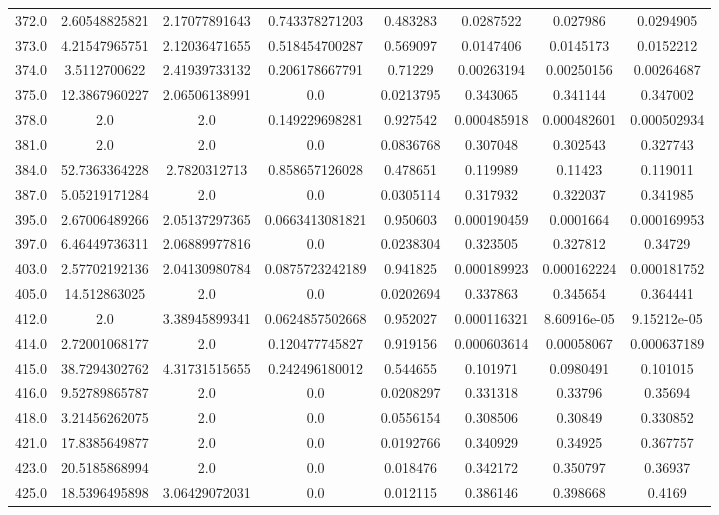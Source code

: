 \begin{longtable}{|c|c|c|c|c|c|c|c|}
372.0 & 2.60548825821 & 2.17077891643 & 0.743378271203 & 0.483283 & 0.0287522 & 0.027986 & 0.0294905 \\
373.0 & 4.21547965751 & 2.12036471655 & 0.518454700287 & 0.569097 & 0.0147406 & 0.0145173 & 0.0152212 \\
374.0 & 3.5112700622 & 2.41939733132 & 0.206178667791 & 0.71229 & 0.00263194 & 0.00250156 & 0.00264687 \\
375.0 & 12.3867960227 & 2.06506138991 & 0.0 & 0.0213795 & 0.343065 & 0.341144 & 0.347002 \\
378.0 & 2.0 & 2.0 & 0.149229698281 & 0.927542 & 0.000485918 & 0.000482601 & 0.000502934 \\
381.0 & 2.0 & 2.0 & 0.0 & 0.0836768 & 0.307048 & 0.302543 & 0.327743 \\
384.0 & 52.7363364228 & 2.7820312713 & 0.858657126028 & 0.478651 & 0.119989 & 0.11423 & 0.119011 \\
387.0 & 5.05219171284 & 2.0 & 0.0 & 0.0305114 & 0.317932 & 0.322037 & 0.341985 \\
395.0 & 2.67006489266 & 2.05137297365 & 0.0663413081821 & 0.950603 & 0.000190459 & 0.0001664 & 0.000169953 \\
397.0 & 6.46449736311 & 2.06889977816 & 0.0 & 0.0238304 & 0.323505 & 0.327812 & 0.34729 \\
403.0 & 2.57702192136 & 2.04130980784 & 0.0875723242189 & 0.941825 & 0.000189923 & 0.000162224 & 0.000181752 \\
405.0 & 14.512863025 & 2.0 & 0.0 & 0.0202694 & 0.337863 & 0.345654 & 0.364441 \\
412.0 & 2.0 & 3.38945899341 & 0.0624857502668 & 0.952027 & 0.000116321 & 8.60916e-05 & 9.15212e-05 \\
414.0 & 2.72001068177 & 2.0 & 0.120477745827 & 0.919156 & 0.000603614 & 0.00058067 & 0.000637189 \\
415.0 & 38.7294302762 & 4.31731515655 & 0.242496180012 & 0.544655 & 0.101971 & 0.0980491 & 0.101015 \\
416.0 & 9.52789865787 & 2.0 & 0.0 & 0.0208297 & 0.331318 & 0.33796 & 0.35694 \\
418.0 & 3.21456262075 & 2.0 & 0.0 & 0.0556154 & 0.308506 & 0.30849 & 0.330852 \\
421.0 & 17.8385649877 & 2.0 & 0.0 & 0.0192766 & 0.340929 & 0.34925 & 0.367757 \\
423.0 & 20.5185868994 & 2.0 & 0.0 & 0.018476 & 0.342172 & 0.350797 & 0.36937 \\
425.0 & 18.5396495898 & 3.06429072031 & 0.0 & 0.012115 & 0.386146 & 0.398668 & 0.4169 \\

\end{longtable}
